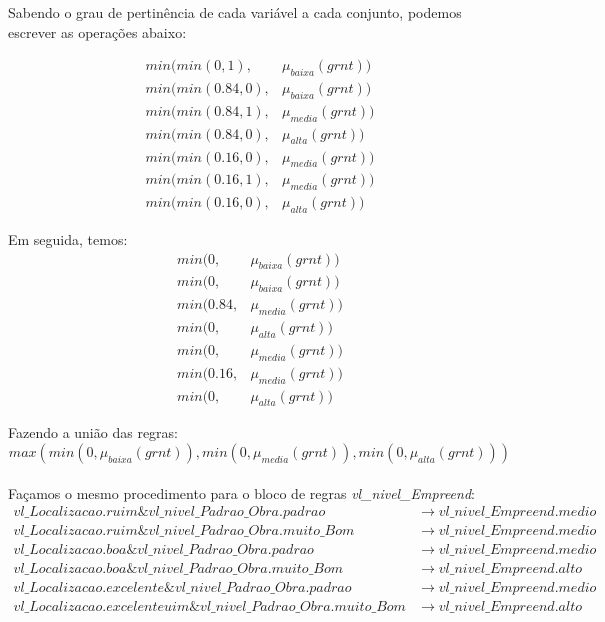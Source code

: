\documentclass[12pt]{article}
\begin{document}
Sabendo o grau de pertinência de cada variável a cada conjunto, podemos escrever as operações abaixo:

\begin{align*}
	min(min(0,1),&\mu_{baixa}(grnt))\\
	min(min(0.84,0),&\mu_{baixa}(grnt))\\
	min(min(0.84,1),&\mu_{media}(grnt))\\
	min(min(0.84,0),&\mu_{alta}(grnt))\\
	min(min(0.16,0),&\mu_{media}(grnt))\\
	min(min(0.16,1),&\mu_{media}(grnt))\\
	min(min(0.16,0),&\mu_{alta}(grnt))
\end{align*}

Em seguida, temos:
\begin{align*}
	min(0,&\mu_{baixa}(grnt))\\
	min(0,&\mu_{baixa}(grnt))\\
	min(0.84,&\mu_{media}(grnt))\\
	min(0,&\mu_{alta}(grnt))\\
	min(0,&\mu_{media}(grnt))\\
	min(0.16,&\mu_{media}(grnt))\\
	min(0,&\mu_{alta}(grnt))
\end{align*}

Fazendo a união das regras:
\begin{equation}\label{eq:uniaoRegrasGarantia}
	max(min(0,\mu_{baixa}(grnt)),min(0,\mu_{media}(grnt)),min(0,\mu_{alta}(grnt)))
\end{equation}\\

Façamos o mesmo procedimento para o bloco de regras \textit{vl\_nivel\_Empreend}:
\begin{align*}
	vl\_Localizacao.ruim\&vl\_nivel\_Padrao\_Obra.padrao&\to vl\_nivel\_Empreend.medio\\
	vl\_Localizacao.ruim\&vl\_nivel\_Padrao\_Obra.muito\_Bom&\to vl\_nivel\_Empreend.medio\\
	vl\_Localizacao.boa\&vl\_nivel\_Padrao\_Obra.padrao&\to vl\_nivel\_Empreend.medio\\
	vl\_Localizacao.boa\&vl\_nivel\_Padrao\_Obra.muito\_Bom&\to vl\_nivel\_Empreend.alto\\
	vl\_Localizacao.excelente\&vl\_nivel\_Padrao\_Obra.padrao&\to vl\_nivel\_Empreend.medio\\
	vl\_Localizacao.excelenteuim\&vl\_nivel\_Padrao\_Obra.muito\_Bom&\to vl\_nivel\_Empreend.alto
\end{align*}
\end{document}
